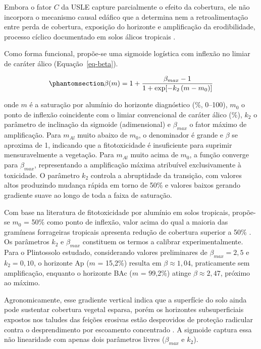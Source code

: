 \documentclass[
  brazilian,
  authoryear,
  preprint]{elsarticle}
\begin{document}
Embora o fator \(C\) da USLE capture parcialmente o efeito da cobertura,
ele não incorpora o mecanismo causal edáfico que a determina nem a
retroalimentação entre perda de cobertura, exposição do horizonte e
amplificação da erodibilidade, processo cíclico documentado em solos
álicos tropicais \citep{cassol_et_al_2023}.

Como forma funcional, propõe-se uma sigmoide logística com inflexão no
limiar de caráter álico (Equação~\ref{eq-beta}).

\begin{equation}\phantomsection\label{eq-beta}{
\beta(m) = 1 + \dfrac{\beta_{max} - 1}{1 + \exp\!\left[-k_2\,(m - m_0)\right]}
}\end{equation}

onde \(m\) é a saturação por alumínio do horizonte diagnóstico (\%,
0--100), \(m_0\) o ponto de inflexão coincidente com o limiar
convencional de caráter álico (\%), \(k_2\) o parâmetro de inclinação da
sigmoide (adimensional) e \(\beta_{max}\) o fator máximo de
amplificação. Para \(m_{Al}\) muito abaixo de \(m_0\), o denominador é
grande e \(\beta\) se aproxima de 1, indicando que a fitotoxicidade é
insuficiente para suprimir mensuravelmente a vegetação. Para \(m_{Al}\)
muito acima de \(m_0\), a função converge para \(\beta_{max}\),
representando a amplificação máxima atribuível exclusivamente à
toxicidade. O parâmetro \(k_2\) controla a abruptidade da transição, com
valores altos produzindo mudança rápida em torno de 50\% e valores
baixos gerando gradiente suave ao longo de toda a faixa de saturação.

Com base na literatura de fitotoxicidade por alumínio em solos
tropicais, propõe-se \(m_0\) = 50\% como ponto de inflexão, valor acima
do qual a maioria das gramíneas forrageiras tropicais apresenta redução
de cobertura superior a 50\% \citep{embrapa_2018}. Os parâmetros \(k_2\)
e \(\beta_{max}\) constituem os termos a calibrar experimentalmente.
Para o Plintossolo estudado, considerando valores preliminares de
\(\beta_{max} = 2{,}5\) e \(k_2 = 0{,}10\), o horizonte Ap (\(m\) =
15,2\%) resulta em \(\beta \approx 1{,}04\), praticamente sem
amplificação, enquanto o horizonte BAc (\(m\) = 99,2\%) atinge
\(\beta \approx 2{,}47\), próximo ao máximo.

Agronomicamente, esse gradiente vertical indica que a superfície do solo
ainda pode sustentar cobertura vegetal esparsa, porém os horizontes
subsuperficiais expostos nos taludes das feições erosivas estão
desprovidos de proteção radicular contra o desprendimento por escoamento
concentrado \citep{vannoppen_2015}. A sigmoide captura essa não
linearidade com apenas dois parâmetros livres (\(\beta_{max}\) e
\(k_2\)).
\end{document}
